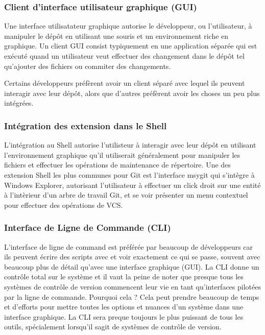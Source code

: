 \subsubsection{Client d'interface utilisateur graphique (GUI)}
Une interface utilisatateur graphique autorise le développeur, ou l'utilisateur, à manipuler le dépôt en utilisant une souris et un environnement riche en graphique.
Un client GUI consist typiquement en une application séparée qui est exécuté quand un utilisateur veut effectuer des changement dans le dépôt tel qu'ajouter des fichiers ou commiter des changements.

Certains développeurs préfèrent avoir un client séparé avec lequel ils peuvent interagir avec leur dépôt, alors que d'autres préfèrent avoir les choses un peu plus intégrées.


\subsubsection{Intégration des extension dans le Shell}
L'intégration au Shell autorise l'utilisteur à interagir avec leur dépôt en utilisant l'environnement graphique qu'il utiliserait généralement pour manipuler les fichiers et effectuer les opérations de maintenance de répertoire.
Une des extension Shell les plus communes pour Git est l'interface msygit qui s'intègre à Windows Explorer, autorisant l'utilisateur à effectuer un click droit sur une entité à l'intèrieur d'un arbre de travail Git, et se voir présenter un menu contextuel pour effectuer des opérations de VCS.

\subsubsection{Interface de Ligne de Commande (CLI)}
L'interface de ligne de command est préférée par beaucoup de développeurs car ils peuvent écrire des scripts avec et voir exactement ce qui se passe, souvent avec beaucoup plus de détail qu'avec une interface graphique (GUI).
La CLI donne un contrôle total sur le système et il vaut la peine de noter que presque tous les systèmes de contrôle de version commencent leur vie en tant qu'interfaces pilotées par la ligne de commande.
Pourquoi cela ? Cela peut prendre beaucoup de temps et d'efforts pour mettre toutes les options et nuances d'un système dans une interface graphique.
La CLI sera preque toujours le plus puissant de tous les outils, spécialement lorsqu'il sagit de systèmes de contrôle de version.

